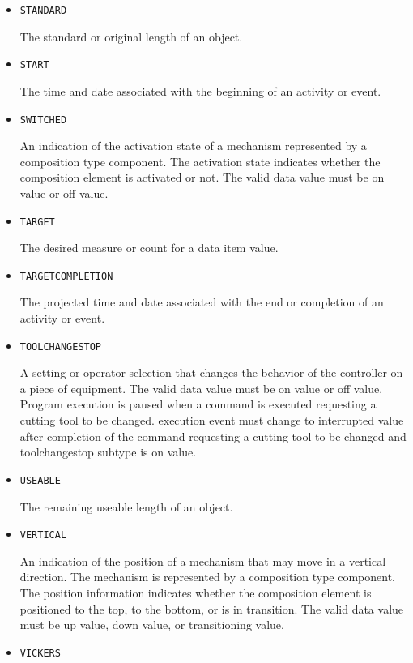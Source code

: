 \begin{itemize}
\item \texttt{STANDARD}  

The standard or original length of an object.


\item \texttt{START}  

The time and date associated with the beginning of an activity or event.


\item \texttt{SWITCHED}  

An indication of the activation state of a mechanism represented by a composition type component.
 The activation state indicates whether the composition element is activated or not.
 The valid data value must be on value or off value.


\item \texttt{TARGET}  

The desired measure or count for a data item value.


\item \texttt{TARGET\textunderscore COMPLETION}  

The projected time and date associated with the end or completion of an activity or event.


\item \texttt{TOOL\textunderscore CHANGE\textunderscore STOP}  

A setting or operator selection that changes the behavior of the controller on a piece of equipment. 
 The valid data value must be on value or off value. 
 Program execution is paused when a command is executed requesting a cutting tool to be changed. 
 execution event must change to interrupted value after completion of the command requesting a cutting tool to be changed and toolchangestop subtype is on value.


\item \texttt{USEABLE}  

The remaining useable length of an object.


\item \texttt{VERTICAL}  

An indication of the position of a mechanism that may move in a vertical direction. The mechanism is represented by a composition type component. 
 The position information indicates whether the composition element is positioned to the top, to the bottom, or is in transition.  
 The valid data value must be up value, down value, or transitioning value.


\item \texttt{VICKERS}  


\end{itemize}

